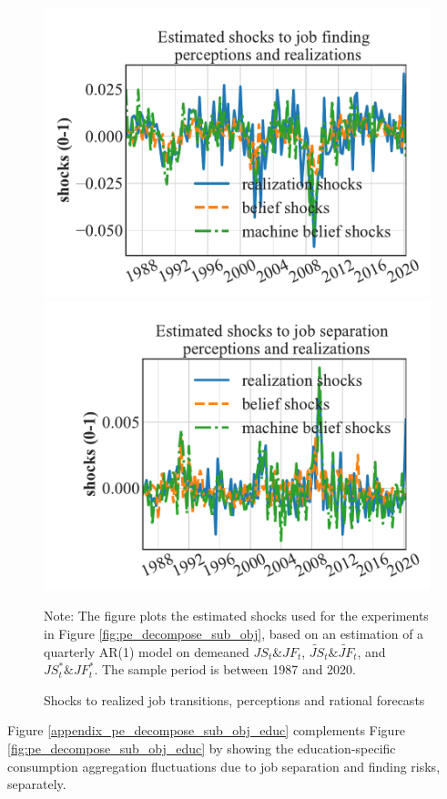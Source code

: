\begin{figure}[pt]
    \centering
    \caption{Shocks to realized job transitions, perceptions and rational forecasts}
    \label{fig:shocks_from_data} \includegraphics[width=0.45\linewidth]{text/Chapter2/Figures/estimated_shocks_job_finding.pdf}
    \includegraphics[width=0.45\linewidth]{text/Chapter2/Figures/estimated_shocks_job_separation.pdf}
\begin{flushleft}\footnotesize {Note: The figure plots the estimated shocks used for the experiments in Figure \ref{fig:pe_decompose_sub_obj}, based on an estimation of a quarterly AR(1) model on demeaned $JS_{t}\& JF_t$, $\widetilde{JS}_t \& \widetilde{JF}_t$, and $JS^{*}_t \& JF^{*}_t$. The sample period is between 1987 and 2020.} \end{flushleft}
\end{figure}



Figure \ref{appendix_pe_decompose_sub_obj_educ} complements Figure \ref{fig:pe_decompose_sub_obj_educ} by showing the education-specific consumption aggregation fluctuations due to job separation and finding risks, separately. 

